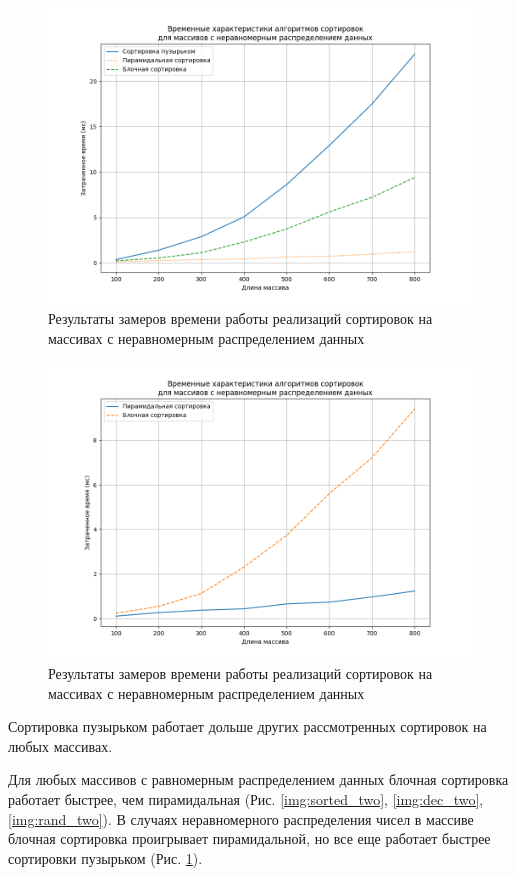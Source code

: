 \begin{figure}[h]
	\includegraphics[scale=0.5]{img/bad.png}
	\centering 
	\caption{Результаты замеров времени работы реализаций сортировок на массивах с неравномерным распределением данных}
	\label{img:bad_all}
\end{figure}

\begin{figure}[h]
	\includegraphics[scale=0.5]{img/bad_two.png}
	\centering 
	\caption{Результаты замеров времени работы реализаций сортировок на массивах с неравномерным распределением данных}
	\label{img:bad_two}
\end{figure}
\clearpage
Сортировка пузырьком работает дольше других рассмотренных сортировок на любых массивах. 

Для любых массивов с равномерным распределением данных блочная сортировка работает быстрее, чем пирамидальная (Рис. \ref{img:sorted_two}, \ref{img:dec_two}, \ref{img:rand_two}). В случаях неравномерного распределения чисел в массиве блочная сортировка проигрывает пирамидальной, но все еще работает быстрее сортировки пузырьком (Рис. \ref{img:bad_all}).
